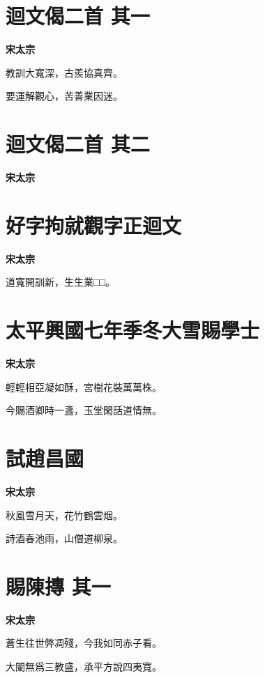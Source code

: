 \documentclass[12pt,a4paper]{ctexbook}
\begin{document}
\section{迴文偈二首  其一}
\textbf{宋太宗}\par\vspace{0.5em}
教訓大寬深，古羨協真齊。\par
要運解觀心，苦善業因迷。\par

\section{迴文偈二首  其二}
\textbf{宋太宗}\par\vspace{0.5em}

\section{好字拘就觀字正迴文}
\textbf{宋太宗}\par\vspace{0.5em}
道寬開訓新，生生業□□。\par

\section{太平興國七年季冬大雪賜學士}
\textbf{宋太宗}\par\vspace{0.5em}
輕輕相亞凝如酥，宮樹花裝萬萬株。\par
今賜酒卿時一盞，玉堂閑話道情無。\par

\section{試趙昌國}
\textbf{宋太宗}\par\vspace{0.5em}
秋風雪月天，花竹鶴雲烟。\par
詩酒春池雨，山僧道柳泉。\par

\section{賜陳摶  其一}
\textbf{宋太宗}\par\vspace{0.5em}
蒼生往世弊凋殘，今我如同赤子看。\par
大闡無爲三教盛，承平方說四夷寬。\par
\end{document}
